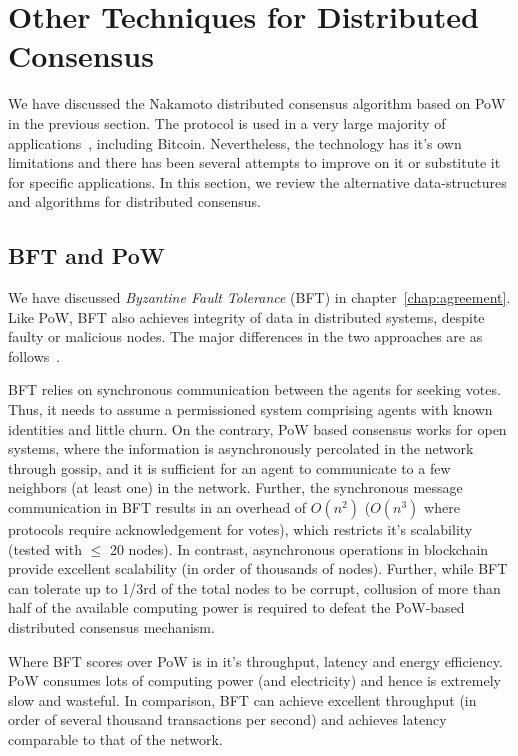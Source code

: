 \section{Other Techniques for Distributed Consensus}

We have discussed the Nakamoto distributed consensus algorithm based on PoW in the previous section. The protocol is used
in a very large majority of applications~\citep{Ferdous:2021}, including Bitcoin. Nevertheless, the technology has it's own 
limitations and there has been several attempts to improve on it or substitute it for specific applications. In this section, 
we review the alternative data-structures and algorithms for distributed consensus.


\subsection{BFT and PoW}
 


We have discussed {\em Byzantine Fault Tolerance} (BFT) in chapter~\ref{chap:agreement}. Like PoW, BFT also achieves integrity 
of data in distributed systems, despite faulty or malicious nodes. The major differences in the two approaches are as 
follows~\citep{Vukolic:2016}.

BFT relies on synchronous communication between the agents for seeking votes. Thus, it needs to assume a permissioned system 
comprising agents with known identities and little churn. On the contrary, PoW based consensus works for open systems, where 
the information is asynchronously percolated in the network through gossip, and it is sufficient for an agent to communicate
to a few neighbors (at least one) in the network.
%
Further, the synchronous message communication in BFT results in an overhead of $O(n^2)$ ($O(n^3)$ where protocols require 
acknowledgement for votes), which restricts it's scalability (tested with $\leq$ 20 nodes). In
contrast, asynchronous operations in blockchain provide excellent scalability (in order of thousands of nodes). 
%
Further, while BFT can tolerate up to 1/3rd of the total nodes to be corrupt, collusion of more than half of the available computing 
power is required to defeat the PoW-based distributed consensus mechanism. 
 
Where BFT scores over PoW is in it's throughput, latency and energy efficiency. PoW consumes lots of computing power (and electricity)
and hence is extremely slow and wasteful. In comparison, BFT can achieve excellent throughput (in order of several thousand transactions 
per second) and achieves latency comparable to that of the network.
 
